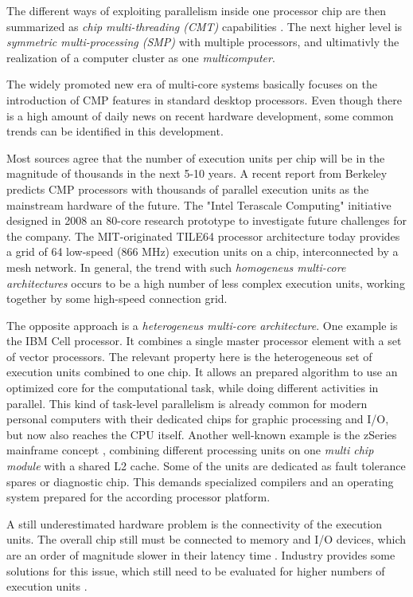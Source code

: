 \documentclass[a4paper]{article}
\begin{document}
The different ways of exploiting parallelism inside one processor chip are then summarized as \emph{chip multi-threading (CMT)} capabilities \cite{cmt}. The next higher level is \emph{symmetric multi-processing (SMP)} with multiple processors, and ultimativly the realization of a computer cluster as one \emph{multicomputer}. 

The widely promoted new era of multi-core systems basically focuses on the introduction of CMP features in standard desktop processors. Even though there is a high amount of daily news on recent hardware development, some common trends can be identified in this development. 

Most sources agree that the number of execution units per chip will be in the magnitude of thousands in the next 5-10 years. A recent report from Berkeley \cite{parcomplandscape} predicts CMP processors with thousands of parallel execution units as the mainstream hardware of the future. The "Intel Terascale Computing" initiative designed in 2008 an 80-core research prototype to investigate future challenges for the company. The MIT-originated TILE64 processor architecture today provides a grid of 64 low-speed (866 MHz) execution units on a chip, interconnected by a mesh network. In general, the trend with such \emph{homogeneus multi-core architectures} occurs to be a high number of less complex execution units, working together by some high-speed connection grid. 

The opposite approach is a \emph{heterogeneus multi-core architecture}. One example is the IBM Cell processor. It combines a single master processor element with a set of vector processors. The relevant property here is the heterogeneous set of execution units combined to one chip. It allows an prepared algorithm to use an optimized core for the computational task, while doing different activities in parallel. This kind of task-level parallelism is already common for modern personal computers with their dedicated chips for graphic processing and I/O, but now also reaches the CPU itself. Another well-known example is the zSeries mainframe concept \cite{zseries990}, combining different processing units on one \emph{multi chip module} with a shared L2 cache. Some of the units are dedicated as fault tolerance spares or diagnostic chip. This demands specialized compilers and an operating system prepared for the according processor platform. 

A still underestimated hardware problem is the connectivity of the execution units. The overall chip still must be connected to memory and I/O devices, which are an order of magnitude slower in their latency time \cite{mcore_bandwidth, mcore_rambandwidth}. Industry provides some solutions for this issue, which still need to be evaluated for higher numbers of execution units \cite{hypertransport}. 
\end{document}
